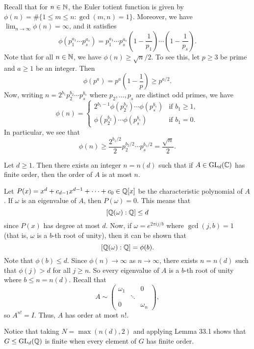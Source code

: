 Recall that for $n \in \mathbb{N}$, the Euler totient function is given by 
$\phi(n) = \#\{1 \leq m \leq n : \gcd(m, n) = 1\}$. Moreover, 
we have $\lim_{n\to\infty} \phi(n) = \infty$, and it satisfies 
\[ \phi(p_1^{a_1} \cdots p_s^{a_s}) = p_1^{a_1} \cdots p_s^{a_s} 
\left(1 - \frac1{p_1}\right) \cdots \left(1 - \frac1{p_s}\right). \] 
Note that for all $n \in \mathbb{N}$, we have $\phi(n) \geq \sqrt{n}/2$. 
To see this, let $p \geq 3$ be prime and $a \geq 1$ be an integer. 
Then 
\[ \phi(p^a) = p^a\left(1 - \frac{1}{p}\right) \geq p^{a/2}. \] 
Now, writing $n = 2^{b_1}p_2^{b_2} \cdots p_s^{b_s}$ where $p_2, \dots, p_s$ 
are distinct odd primes, we have 
\[ \phi(n) = \begin{cases}
    2^{b_1-1}\phi(p_2^{b_2}) \cdots \phi(p_s^{b_s}) & \text{if } b_1 \geq 1, \\ 
    \phi(p_2^{b_2}) \cdots \phi(p_s^{b_s}) & \text{if } b_1 = 0. 
\end{cases} \] 
In particular, we see that 
\[ \phi(n) \geq \frac{2^{b_1/2}}2 p_2^{b_2/2} \cdots p_s^{b_s/2} = \frac{\sqrt n}2. \] 
\begin{lemma}{}
    Let $d \geq 1$. Then there exists an integer $n = n(d)$ such that if 
    $A \in \operatorname{GL}_d(\mathbb{C})$ has finite order, then the order of $A$ is at most $n$. 
\end{lemma}
\begin{pf}
    Let $P(x) = x^d + c_{d-1}x^{d-1} + \cdots + c_0 \in \mathbb{Q}[x]$ be the characteristic 
    polynomial of $A$. If $\omega$ is an eigenvalue of $A$, then $P(\omega) = 0$. This 
    means that 
    \[ [\mathbb{Q}(\omega) : \mathbb{Q}] \leq d \] 
    since $P(x)$ has degree at most $d$. Now, if $\omega = e^{2\pi ij/b}$ 
    where $\gcd(j, b) = 1$ (that is, $\omega$ is a $b$-th root of unity), then 
    it can be shown that 
    \[ [\mathbb{Q}(\omega) : \mathbb{Q}] = \phi(b). \] 
    Note that $\phi(b) \leq d$. Since $\phi(n) \to \infty$ as $n \to \infty$, 
    there exists $n = n(d)$ such that $\phi(j) > d$ for all $j \geq n$. 
    So every eigenvalue of $A$ is a $b$-th root of unity where $b \leq 
    n = n(d)$. Recall that 
    \[ A \sim \begin{pmatrix}
        \omega_1 & & 0 \\ 
        & \ddots & \\ 
        0 & & \omega_n
    \end{pmatrix}, \] 
    so $A^{n!} = I$. Thus, $A$ has order at most $n!$. 
\end{pf}

Notice that taking $N = \max(n(d), 2)$ and applying Lemma 33.1 shows that 
$G \leq \operatorname{GL}_d(\mathbb{Q})$ is finite when every element of $G$ has finite order.  